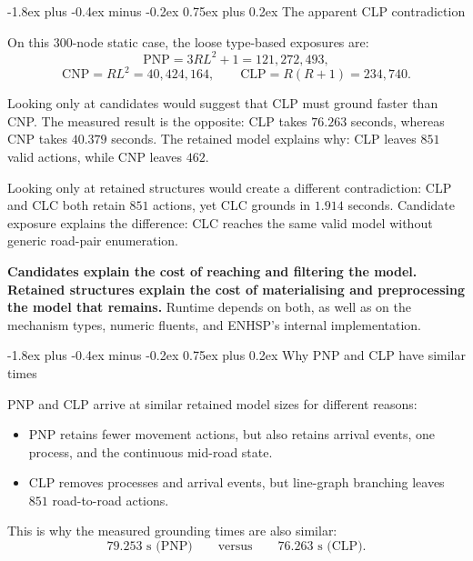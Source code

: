 \documentclass[11pt,a4paper]{article}
\makeatletter
\renewcommand{\subsection}{\@startsection{subsection}{2}{0pt}
  {-1.8ex plus -0.4ex minus -0.2ex}
  {0.75ex plus 0.2ex}
  {\normalfont\large\bfseries\color{RoutlyNavy}}}
\makeatother
\begin{document}
\subsection{The apparent CLP contradiction}

On this 300-node static case, the loose type-based exposures are:
\[
\text{PNP}=3RL^2+1=121{,}272{,}493,
\]
\[
\text{CNP}=RL^2=40{,}424{,}164,
\qquad
\text{CLP}=R(R+1)=234{,}740.
\]

Looking only at candidates would suggest that CLP must ground faster than
CNP. The measured result is the opposite: CLP takes \(76.263\) seconds,
whereas CNP takes \(40.379\) seconds. The retained model explains why:
CLP leaves \(851\) valid actions, while CNP leaves \(462\).

Looking only at retained structures would create a different contradiction:
CLP and CLC both retain \(851\) actions, yet CLC grounds in \(1.914\) seconds.
Candidate exposure explains the difference: CLC reaches the same valid model
without generic road-pair enumeration.

\begin{keybox}
\textbf{Candidates explain the cost of reaching and filtering the model.}
\textbf{Retained structures explain the cost of materialising and preprocessing
the model that remains.} Runtime depends on both, as well as on the mechanism
types, numeric fluents, and ENHSP's internal implementation.
\end{keybox}

\subsection{Why PNP and CLP have similar times}

PNP and CLP arrive at similar retained model sizes for different reasons:

\begin{itemize}
  \item PNP retains fewer movement actions, but also retains arrival events,
  one process, and the continuous mid-road state.
  \item CLP removes processes and arrival events, but line-graph branching
  leaves \(851\) road-to-road actions.
\end{itemize}

This is why the measured grounding times are also similar:
\[
79.253\text{ s (PNP)}
\qquad\text{versus}\qquad
76.263\text{ s (CLP)}.
\]

\clearpage
\end{document}
